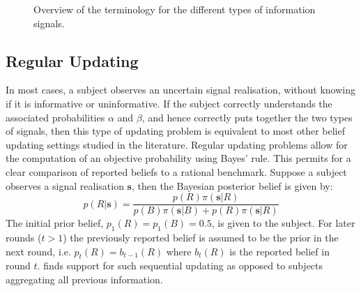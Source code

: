 \documentclass{article}
\begin{document}
\begin{figure}[!ht]
\centering
{}
\caption{\small{Overview of the terminology for the different types of information signals.}}
\label{fig:terminology}
\end{figure}


\subsection{Regular Updating}

In most cases, a subject observes an uncertain signal realisation, without knowing if it is informative or uninformative. If the subject correctly understands the associated probabilities $\alpha$ and $\beta$, and hence correctly puts together the two types of signals, then this type of updating problem is equivalent to most other belief updating settings studied in the literature. Regular updating problems allow for the computation of an objective probability using Bayes' rule. This permits for a clear comparison of reported beliefs to a rational benchmark. Suppose a subject observes a signal realisation $\mathbf{s}$, then the Bayesian posterior belief is given by:
\begin{equation}
\label{eq-bayes}
p(R|\mathbf{s})=\frac{p(R)\pi(\mathbf{s}|R)}{p(B)\pi(\mathbf{s}|B)+p(R)\pi(\mathbf{s}|R)}    
\end{equation}
The initial prior belief, $p_1(R)=p_1(B)=0.5$, is given to the subject. For later rounds ($t>1$) the previously reported belief is assumed to be the prior in the next round, i.e. $p_t(R)=b_{t-1}(R)$ where $b_t(R)$ is the reported belief in round $t$. \cite{Benjamin2019}  finds support for such sequential updating as opposed to subjects aggregating all previous information.
\end{document}
